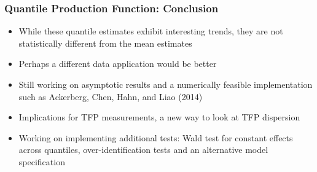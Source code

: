 \documentclass{beamer}
\begin{document}
\begin{frame}
\frametitle{Quantile Production Function: Conclusion}
\begin{itemize}
	\item While these quantile estimates exhibit interesting trends, they are not statistically different from the mean estimates
	\item Perhaps a different data application would be better
	\item Still working on asymptotic results and a numerically feasible implementation such as Ackerberg, Chen, Hahn, and Liao (2014)
	\item Implications for TFP measurements, a new way to look at TFP dispersion
	\item Working on implementing additional tests: Wald test for constant effects across quantiles, over-identification tests and an alternative model specification
\end{itemize}
\end{frame}
\end{document}
